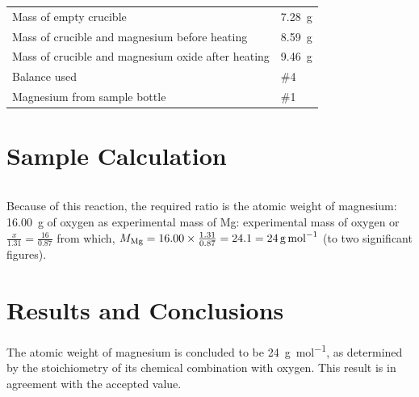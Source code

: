 \documentclass{article}
\begin{document}
\begin{tabular}{ll}
Mass of empty crucible & \SI{7.28}{\gram}\\
Mass of crucible and magnesium before heating & \SI{8.59}{\gram}\\
Mass of crucible and magnesium oxide after heating & \SI{9.46}{\gram}\\
Balance used & \#4\\
Magnesium from sample bottle & \#1
\end{tabular}


\section{Sample Calculation}

\begin{tabular}{ll}
\end{tabular}

Because of this reaction, the required ratio is the atomic weight of magnesium: \SI{16.00}{\gram} of oxygen as experimental mass of Mg: experimental mass of oxygen or $\frac{x}{1.31}=\frac{16}{0.87}$ from which, $M_{\ce{Mg}} = 16.00 \times \frac{1.31}{0.87} = 24.1 = \SI{24}{\gram\per\mole}$ (to two significant figures).


\section{Results and Conclusions}

The atomic weight of magnesium is concluded to be \SI{24}{\gram\per\mol}, as determined by the stoichiometry of its chemical combination with oxygen. This result is in agreement with the accepted value.
\end{document}
